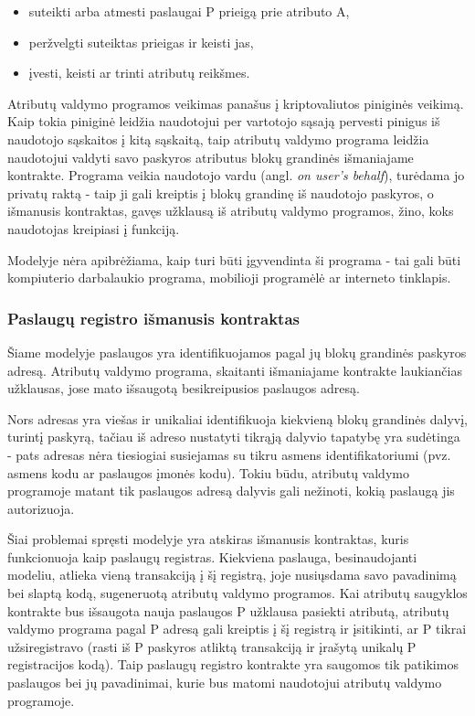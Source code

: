 \begin{itemize}
    \item suteikti arba atmesti paslaugai P prieigą prie atributo A,
    \item peržvelgti suteiktas prieigas ir keisti jas,
    \item įvesti, keisti ar trinti atributų reikšmes.
\end{itemize}

Atributų valdymo programos veikimas panašus į kriptovaliutos piniginės veikimą. Kaip tokia piniginė leidžia naudotojui per vartotojo sąsają
pervesti pinigus iš naudotojo sąskaitos į kitą sąskaitą, taip atributų valdymo programa leidžia naudotojui
valdyti savo paskyros atributus blokų grandinės išmaniajame kontrakte. Programa veikia naudotojo vardu (angl. \textit{on user's behalf}),
turėdama jo privatų raktą
- taip ji gali kreiptis į blokų grandinę
iš naudotojo paskyros, o išmanusis kontraktas, gavęs užklausą iš atributų valdymo programos,
žino, koks naudotojas kreipiasi į funkciją.

Modelyje nėra apibrėžiama, kaip turi būti įgyvendinta ši programa - tai gali būti kompiuterio darbalaukio programa,
mobilioji programėlė ar interneto tinklapis. 

\subsubsection{Paslaugų registro išmanusis kontraktas} \label{BCIDM:serviceRegister}

Šiame modelyje paslaugos yra identifikuojamos pagal jų blokų grandinės paskyros adresą. Atributų valdymo programa,
skaitanti išmaniajame kontrakte laukiančias užklausas, jose mato išsaugotą besikreipusios paslaugos adresą.

Nors adresas yra viešas ir unikaliai identifikuoja kiekvieną blokų grandinės dalyvį, turintį paskyrą, tačiau iš adreso nustatyti tikrąją dalyvio tapatybę yra sudėtinga -
pats adresas nėra tiesiogiai susiejamas su tikru asmens identifikatoriumi (pvz. asmens kodu ar paslaugos įmonės kodu).
Tokiu būdu, atributų valdymo programoje matant tik paslaugos adresą dalyvis gali nežinoti, kokią paslaugą jis autorizuoja.

Šiai problemai spręsti modelyje yra atskiras išmanusis kontraktas, kuris funkcionuoja kaip paslaugų registras. Kiekviena
paslauga, besinaudojanti modeliu, atlieka vieną transakciją į šį registrą, joje nusiųsdama savo pavadinimą bei slaptą kodą,
sugeneruotą atributų valdymo programos. Kai atributų saugyklos kontrakte bus išsaugota nauja paslaugos
P užklausa pasiekti atributą, atributų valdymo programa pagal P adresą gali kreiptis
į šį registrą ir įsitikinti, ar P tikrai užsiregistravo (rasti iš P paskyros atliktą transakciją ir įrašytą unikalų P registracijos kodą).
Taip paslaugų registro kontrakte yra saugomos tik patikimos paslaugos bei jų pavadinimai, kurie bus matomi naudotojui
atributų valdymo programoje.

